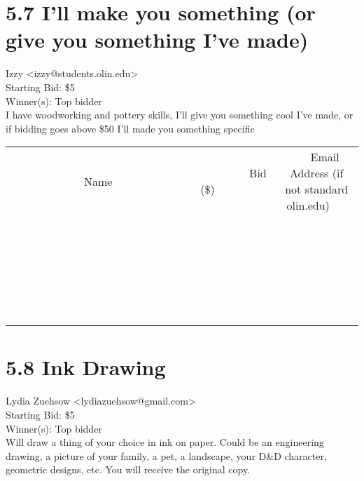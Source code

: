 \documentclass[11pt]{article}
\begin{document}
					\section*{5.7 I'll make you something (or give you something I've made)}
					Izzy <izzy@students.olin.edu> \\
					Starting Bid: \$5 \\
					Winner(s): Top bidder \\
					I have woodworking and pottery skills, I'll give you something cool I've made, or if bidding goes above \$50 I'll made you something specific \\
					[6ex]
					\begin{tabular}{c c c}
						~~~~~~~~~~~~~Name~~~~~~~~~~~~~ & ~~~~~~~~~Bid (\$)~~~~~~~~~ & ~~~Email Address (if not standard olin.edu)~~~ \\
				
 & & \\
\hline
 & & \\
\hline
 & & \\
\hline
 & & \\
\hline
 & & \\
\hline
 & & \\
\hline
 & & \\
\hline
 & & \\
\hline
 & & \\
\hline
 & & \\
\hline
 & & \\
\hline
 & & \\
\hline
 & & \\
\hline
 & & \\
\hline
 & & \\
\hline
 & & \\
\hline
 & & \\
\hline
 & & \\
\hline
 & & \\
\hline
 & & \\
\hline
 & & \\
\hline
 & & \\
\hline
 & & \\
\hline
 & & \\
\hline
 & & \\
\hline
 & & \\
\hline
					\end{tabular}
					\clearpage
				
					\section*{5.8 Ink Drawing}
					Lydia Zuehsow <lydiazuehsow@gmail.com> \\
					Starting Bid: \$5 \\
					Winner(s): Top bidder \\
					Will draw a thing of your choice in ink on paper. Could be an engineering drawing, a picture of your family, a pet, a landscape, your D\&D character, geometric designs, etc. You will receive the original copy.
\end{document}
